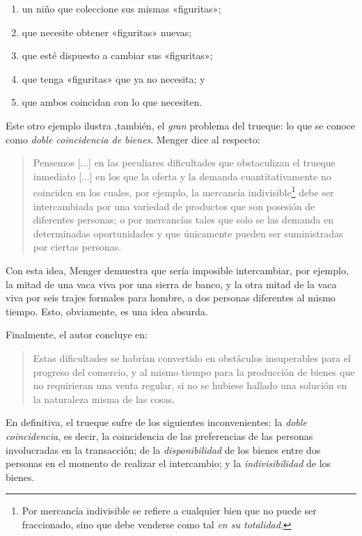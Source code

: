 \documentclass[12pt,a4paper,twoside]{book}
\begin{document}
\begin{enumerate}
\item un niño que coleccione sus mismas «figuritas»;
\item que necesite obtener «figuritas» nuevas;
\item que esté dispuesto a cambiar sus «figuritas»;
\item que tenga «figuritas» que ya no necesita; y
\item que ambos coincidan con lo que necesiten.
\end{enumerate}

Este otro ejemplo ilustra ,también, el \textit{gran} problema del trueque: lo que se conoce como \textit{doble coincidencia de bienes}. Menger dice al respecto:

\begin{quotation}
Pensemos [...] en las peculiares dificultades que obstaculizan el trueque inmediato [...] en los que la oferta y la demanda cuantitativamente no coinciden en los cuales, por ejemplo, la mercancía indivisible\footnote{Por mercancía indivisible se refiere a cualquier bien que no puede ser fraccionado, sino que debe venderse como tal \textit{en su totalidad}.} debe ser intercambiada por una variedad de productos que son posesión de diferentes personas; o por mercancías tales que solo se las demanda en determinadas oportunidades y que únicamente pueden ser suministradas por ciertas personas. \cite[pág. 242]{menger:origen}
\end{quotation}

Con esta idea, Menger demuestra que sería imposible intercambiar, por ejemplo, la mitad de una vaca viva por una sierra de banco, y la otra mitad de la vaca viva por seis trajes formales para hombre, a dos personas diferentes al mismo tiempo. Esto, obviamente, es una idea absurda.

Finalmente, el autor concluye en: 

\begin{quotation}
Estas dificultades se habrían convertido en obstáculos insuperables para el progreso del comercio, y al mismo tiempo para la producción de bienes que no requirieran una venta regular, si no se hubiese hallado una solución en la naturaleza misma de las cosas. \cite[pág. 242]{menger:origen}
\end{quotation}

En definitiva, el trueque sufre de los siguientes inconvenientes: la \textit{doble coincidencia}, es decir, la coincidencia de las preferencias de las personas involucradas en la transacción; de la \textit{disponibilidad} de los bienes entre dos personas en el momento de realizar el intercambio; y la \textit{indivisibilidad} de los bienes.
\end{document}
